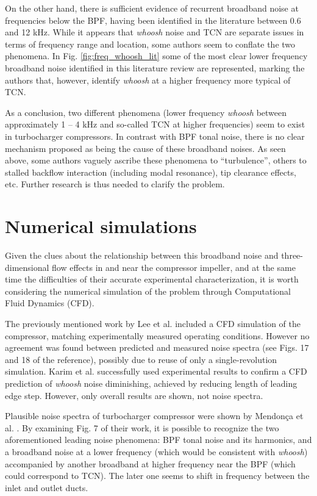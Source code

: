 On the other hand, there is sufficient evidence of recurrent broadband noise at frequencies below the BPF, having been identified in the literature between 0.6 and 12 kHz. While it appears that  \emph{whoosh} noise and TCN are separate issues in terms of frequency range and location, some authors seem to conflate the two phenomena. In Fig. \ref{fig:freq_whoosh_lit} some of the most clear lower  frequency broadband noise identified in this literature review are represented, marking the authors that, however, identify \emph{whoosh} at a higher frequency more typical of TCN.

As a conclusion, two different phenomena (lower frequency \emph{whoosh} between approximately 1 -- 4 kHz and so-called TCN at higher frequencies) seem to exist in turbocharger compressors. In contrast with BPF tonal noise, there is no clear mechanism proposed as being the cause of these broadband noises. As seen above, some authors vaguely ascribe these phenomena to ``turbulence'', others to stalled backflow interaction (including modal resonance), tip clearance effects, etc. Further research is thus needed to clarify the problem.

\section{Numerical simulations}

Given the clues about the relationship between this broadband noise and three-dimensional flow effects in and near the compressor impeller, and at the same time the difficulties of their accurate experimental characterization, it is worth considering the numerical simulation of the problem through Computational Fluid Dynamics (CFD).

The previously mentioned work by Lee et al. \cite{lee2011control} included a CFD simulation of the compressor, matching experimentally measured operating conditions. However no agreement was found between predicted and measured noise spectra (see Figs. 17 and 18 of the reference), possibly due to reuse of only a single-revolution simulation. Karim et al. \cite{karim2013computational} successfully used experimental results to confirm a CFD prediction of \emph{whoosh} noise diminishing, achieved by reducing length of leading edge step. However, only overall results are shown, not noise spectra.

Plausible noise spectra of turbocharger compressor were shown by Mendonça et al. \cite{mendonca2012simulation}. By examining Fig. 7 of their work, it is possible to recognize the two aforementioned leading noise phenomena: BPF tonal noise and its harmonics, and a broadband noise at a lower frequency (which would be consistent with \emph{whoosh}) accompanied by another broadband at higher frequency near the BPF (which could correspond to TCN). The later one seems to shift in frequency between the inlet and outlet ducts. 

